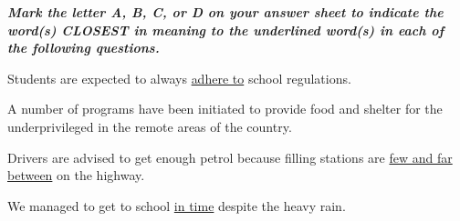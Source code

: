 \documentclass[11pt]{article}
\begin{document}
\begin{multiplechoice}[rearrange=yes, keycolumns=2]%
\examvspace*{0.7cm}
\textit{\textbf{Mark the letter A, B, C, or D on your answer sheet to indicate the word(s) CLOSEST in meaning to
the underlined word(s) in each of the following questions.}}
\begin{question} %
Students are expected to always \underline{adhere to} school regulations.
\datcot
\bonpa
{}
{}
{}
{}
\end{question}

\begin{question} %
A number of programs have been initiated to provide food and shelter for the underprivileged in
the remote areas of the country.
\datcot
\bonpa
{}
{}
{}
{}
\end{question}
\end{multiplechoice}

\begin{multiplechoice}[rearrange=yes, keycolumns=2]%
\examvspace*{0.7cm}
\textit{\textbf{ }}
\begin{question} %
Drivers are advised to get enough petrol because filling stations are \underline{few and far between} on the
highway.
\datcot
\bonpa
{}
{}
{}
{}
\end{question}

\begin{question} %
We managed to get to school \underline{in time} despite the heavy rain.
\datcot[2]
\bonpa
{}
{}
{}
{}
\end{question}
\end{multiplechoice}
\end{document}
